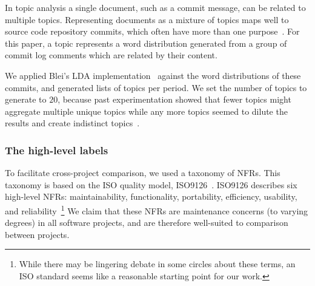 \documentclass[]{sig-alternate}
\begin{document}
In topic analysis a single document, such as a commit message, can be related to multiple topics. 
Representing documents as a mixture of topics maps well to source code repository commits, which often have more than one purpose~\cite{Hindle09ICSM}.  
For this paper, a topic represents a word distribution generated from a group of commit log comments which are related by their content.  

We applied Blei's LDA implementation~\cite{Blei2003} against the word distributions of these commits, and generated lists of topics per period. 
We set the number of topics to generate to $20$, because past experimentation showed that fewer topics might aggregate multiple unique topics while any more topics seemed to dilute the results and create indistinct topics~\cite{Hindle09ICSM}. 

\subsubsection{The high-level labels}


To facilitate cross-project comparison, we used a taxonomy of NFRs. This taxonomy is based on the ISO quality model, ISO9126~\cite{iso9126}. 
ISO9126 describes six high-level NFRs: maintainability, functionality,
portability, efficiency, usability, and reliability~\footnote{While there may be lingering debate in some circles about these terms, an ISO standard seems like a reasonable starting point for our work.}
We claim that these NFRs are maintenance concerns (to varying degrees) in all software projects, and are therefore well-suited to comparison between projects.

\end{document}
